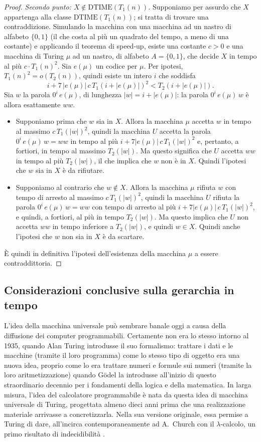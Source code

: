 \begin{proof}
\medskip
\noindent\emph{Secondo punto: $X\notin\mathrm{DTIME}(T_1(n))$.} Supponiamo per assurdo che $X$ appartenga alla classe $\mathrm{DTIME}(T_1(n))$; si tratta di trovare una contraddizione. Simulando la macchina con una macchina ad un nastro di alfabeto $\{0,1\}$ (il che costa al più un quadrato del tempo, a meno di una costante) e applicando il teorema di speed-up, esiste una costante $c>0$ e una macchina di Turing $\mu$ ad un nastro, di alfabeto $A=\{0,1\}$, che decide $X$ in tempo al più $c\cdot T_1(n)^2$. Sia $e(\mu)$ un codice per $\mu$. Per ipotesi, $T_1(n)^2=o(T_2(n))$, quindi esiste un intero $i$ che soddisfa
\[
i+7\,|e(\mu)|\,c\,T_1(i+|e(\mu)|)^2<T_2(i+|e(\mu)|).
\]
Sia $w$ la parola $0^i\,e(\mu)$, di lunghezza $|w|=i+|e(\mu)|$: la parola $0^i\,e(\mu)\,w$ è allora esattamente $ww$.
\begin{itemize}
\item Supponiamo prima che $w$ sia in $X$. Allora la macchina $\mu$ accetta $w$ in tempo al massimo $c\,T_1(|w|)^2$, quindi la macchina $U$ accetta la parola $0^i\,e(\mu)\,w=ww$ in tempo al più $i+7|e(\mu)|\,c\,T_1(|w|)^2$ e, pertanto, a fortiori, in tempo al massimo $T_2(|w|)$. Ma questo significa che $U$ accetta $ww$ in tempo al più $T_2(|w|)$, il che implica che $w$ non è in $X$. Quindi l'ipotesi che $w$ sia in $X$ è da rifiutare.
\item Supponiamo al contrario che $w\notin X$. Allora la macchina $\mu$ rifiuta $w$ con tempo di arresto al massimo $c\,T_1(|w|)^2$, quindi la macchina $U$ rifiuta la parola $0^i\,e(\mu)\,w=ww$ con tempo di arresto al più $i+7|e(\mu)|\,c\,T_1(|w|)^2$, e quindi, a fortiori, al più in tempo $T_2(|w|)$. Ma questo implica che $U$ non accetta $ww$ in tempo inferiore a $T_2(|w|)$, e quindi $w\in X$. Quindi anche l'ipotesi che $w$ non sia in $X$ è da scartare.
\end{itemize}
È quindi in definitiva l'ipotesi dell'esistenza della macchina $\mu$ a essere contraddittoria.
\end{proof}

\subsection{Considerazioni conclusive sulla gerarchia in tempo}

L'idea della macchina universale può sembrare banale oggi a causa della diffusione dei computer programmabili. Certamente non era lo stesso intorno al 1935, quando Alan Turing introdusse il suo formalismo: trattare i dati e le macchine (tramite il loro programma) come lo stesso tipo di oggetto era una nuova idea, proprio come lo era trattare numeri e formule sui numeri (tramite la loro aritmetizzazione) quando Gödel la introdusse all'inizio di questo straordinario decennio per i fondamenti della logica e della matematica. In larga misura, l'idea del calcolatore programmabile è nata da questa idea di macchina universale di Turing, progettata almeno dieci anni prima che una realizzazione materiale arrivasse a concretizzarla. Nella sua versione originale, essa permise a Turing di dare, all'incirca contemporaneamente ad A.\ Church con il $\lambda$-calcolo, un primo risultato di indecidibilità \cite{Turing1936}.

